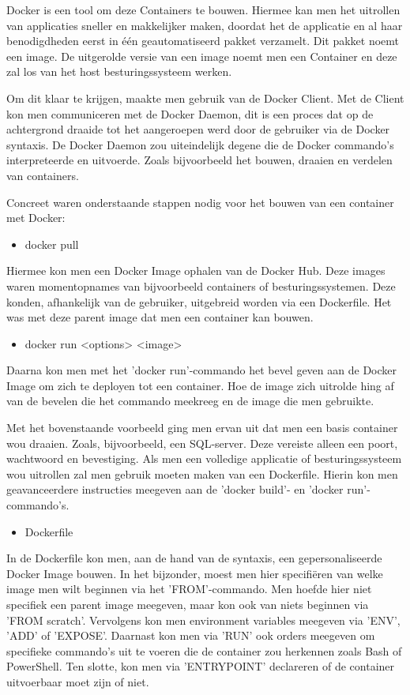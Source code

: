 Docker is een tool om deze Containers te bouwen. Hiermee kan men het uitrollen van applicaties sneller en makkelijker maken, doordat het de applicatie en al haar benodigdheden eerst in één geautomatiseerd pakket verzamelt. Dit pakket noemt een image. De uitgerolde versie van een image noemt men een Container en deze zal los van het host besturingssysteem werken.

Om dit klaar te krijgen, maakte men gebruik van de Docker Client. Met de Client kon men communiceren met de Docker Daemon, dit is een proces dat op de achtergrond draaide tot het aangeroepen werd door de gebruiker via de Docker syntaxis. De Docker Daemon zou uiteindelijk degene die de Docker commando's interpreteerde en uitvoerde. Zoals bijvoorbeeld het bouwen, draaien en verdelen van containers.

Concreet waren onderstaande stappen nodig voor het bouwen van een container met Docker:
\begin{itemize}[noitemsep]
	\item docker pull
\end{itemize}
Hiermee kon men een Docker Image ophalen van de Docker Hub. Deze images waren momentopnames van bijvoorbeeld containers of besturingssystemen. Deze konden, afhankelijk van de gebruiker, uitgebreid worden via een Dockerfile. Het was met deze parent image dat men een container kan bouwen.

\begin{itemize}[noitemsep]
	\item docker run <options> <image>
\end{itemize}
Daarna kon men met het 'docker run'-commando het bevel geven aan de Docker Image om zich te deployen tot een container. Hoe de image zich uitrolde hing af van de bevelen die het commando meekreeg en de image die men gebruikte.

Met het bovenstaande voorbeeld ging men ervan uit dat men een basis container wou draaien. Zoals, bijvoorbeeld, een SQL-server. Deze vereiste alleen een poort, wachtwoord en bevestiging. Als men een volledige applicatie of besturingssysteem wou uitrollen zal men gebruik moeten maken van een Dockerfile. Hierin kon men geavanceerdere instructies meegeven aan de 'docker build'- en 'docker run'-commando's.

\begin{itemize}[noitemsep]
	\item Dockerfile
\end{itemize}
In de Dockerfile kon men, aan de hand van de syntaxis, een gepersonaliseerde Docker Image bouwen. In het bijzonder, moest men hier specifiëren van welke image men wilt beginnen via het 'FROM'-commando. Men hoefde hier niet specifiek een parent image meegeven, maar kon ook van niets beginnen via 'FROM scratch'. Vervolgens kon men environment variables meegeven via 'ENV', 'ADD' of 'EXPOSE'. Daarnast kon men via 'RUN' ook orders meegeven om specifieke commando's uit te voeren die de container zou herkennen zoals Bash of PowerShell. Ten slotte, kon men via 'ENTRYPOINT' declareren of de container uitvoerbaar moet zijn of niet.

